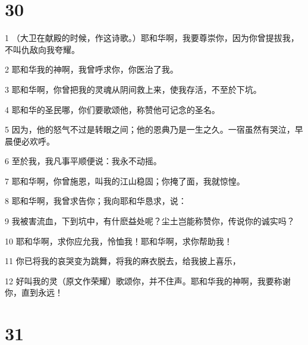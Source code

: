 \chapter{30}

\par 1 （大卫在献殿的时候，作这诗歌。）耶和华啊，我要尊崇你，因为你曾提拔我，不叫仇敌向我夸耀。
\par 2 耶和华我的神啊，我曾呼求你，你医治了我。
\par 3 耶和华啊，你曾把我的灵魂从阴间救上来，使我存活，不至於下坑。
\par 4 耶和华的圣民哪，你们要歌颂他，称赞他可记念的圣名。
\par 5 因为，他的怒气不过是转眼之间；他的恩典乃是一生之久。一宿虽然有哭泣，早晨便必欢呼。
\par 6 至於我，我凡事平顺便说：我永不动摇。
\par 7 耶和华啊，你曾施恩，叫我的江山稳固；你掩了面，我就惊惶。
\par 8 耶和华啊，我曾求告你；我向耶和华恳求，说：
\par 9 我被害流血，下到坑中，有什麽益处呢？尘土岂能称赞你，传说你的诚实吗？
\par 10 耶和华啊，求你应允我，怜恤我！耶和华啊，求你帮助我！
\par 11 你已将我的哀哭变为跳舞，将我的麻衣脱去，给我披上喜乐，
\par 12 好叫我的灵（原文作荣耀）歌颂你，并不住声。耶和华我的神啊，我要称谢你，直到永远！

\chapter{31}

